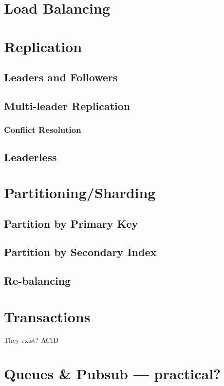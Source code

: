 \section{Load Balancing}

\section{Replication}
\subsection{Leaders and Followers}

\subsection{Multi-leader Replication}
\subsubsection{Conflict Resolution}

\subsection{Leaderless}

\section{Partitioning/Sharding}

\subsection{Partition by Primary Key}

\subsection{Partition by Secondary Index}

\subsection{Re-balancing}

\section{Transactions}
They exist? ACID

\section{Queues \& Pubsub --- practical?}

